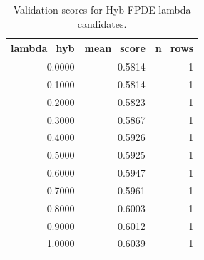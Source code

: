 \begin{table}[t]
\caption{Validation scores for Hyb-FPDE lambda candidates.}
\label{tab:lambda_distribution_computed}
\centering
\begin{tabular}{rrr}
\toprule
lambda\_hyb & mean\_score & n\_rows \\
\midrule
0.0000 & 0.5814 & 1 \\
0.1000 & 0.5814 & 1 \\
0.2000 & 0.5823 & 1 \\
0.3000 & 0.5867 & 1 \\
0.4000 & 0.5926 & 1 \\
0.5000 & 0.5925 & 1 \\
0.6000 & 0.5947 & 1 \\
0.7000 & 0.5961 & 1 \\
0.8000 & 0.6003 & 1 \\
0.9000 & 0.6012 & 1 \\
1.0000 & 0.6039 & 1 \\
\bottomrule
\end{tabular}

\end{table}
